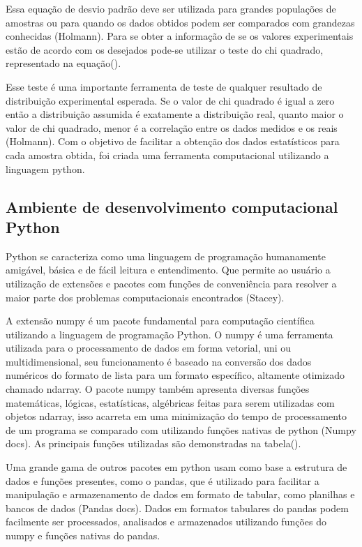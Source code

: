 Essa equação de desvio padrão deve ser utilizada para grandes populações de amostras ou para quando os dados obtidos podem ser comparados com grandezas conhecidas (Holmann). Para se obter a informação de se os valores experimentais estão de acordo com os desejados pode-se utilizar o teste do chi quadrado, representado na equação().

Esse teste é uma importante ferramenta de teste de qualquer resultado de distribuição experimental esperada. Se o valor de chi quadrado é igual a zero então a distribuição assumida é exatamente a distribuição real, quanto maior o valor de chi quadrado, menor é a correlação entre os dados medidos e os reais (Holmann). Com o objetivo de facilitar a obtenção dos dados estatísticos para cada amostra obtida, foi criada uma ferramenta computacional utilizando a linguagem python.

\subsection{Ambiente de desenvolvimento computacional Python}

Python se caracteriza como uma linguagem de programação humanamente amigável, básica e de fácil leitura e entendimento. Que permite ao usuário a utilização de extensões e pacotes com funções de conveniência para resolver a maior parte dos problemas computacionais encontrados (Stacey).

A extensão numpy é um pacote fundamental para computação científica utilizando a linguagem de programação Python. O numpy é uma ferramenta utilizada para o processamento de dados em forma vetorial, uni ou multidimensional, seu funcionamento é baseado na conversão dos dados numéricos do formato de lista para um formato específico, altamente otimizado chamado ndarray. O pacote numpy também apresenta diversas funções matemáticas, lógicas, estatísticas, algébricas feitas para serem utilizadas com objetos ndarray, isso acarreta em uma minimização do tempo de processamento de um programa se comparado com utilizando funções nativas de python (Numpy docs). As principais funções utilizadas são demonstradas na tabela().

Uma grande gama de outros pacotes em python usam como base a estrutura de dados e funções presentes, como o pandas, que é utilizado para facilitar a manipulação e armazenamento de dados em formato de tabular, como planilhas e bancos de dados (Pandas docs). Dados em formatos tabulares do pandas podem facilmente ser processados, analisados e armazenados utilizando funções do numpy e funções nativas do pandas.


